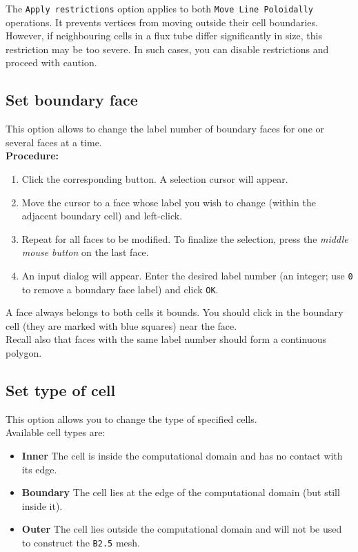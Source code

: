 \documentclass[a4paper,12pt]{article}
\begin{document}
  \begin{infobox}
    The {\tt Apply restrictions} option applies to both {\tt Move Line Poloidally} operations. It prevents vertices from moving outside their cell boundaries. However, if neighbouring cells in a flux tube differ significantly in size, this restriction may be too severe. In such cases, you can disable restrictions and proceed with caution.
  \end{infobox}

  \subsection{Set boundary face}

  This option allows to change the label number of boundary faces for one or several faces at a time. \\

  \textbf{Procedure:}
  \begin{enumerate}[itemsep=2pt,topsep=5pt]
    \item Click the corresponding button. A selection cursor will appear.
    \item Move the cursor to a face whose label you wish to change (within the adjacent boundary cell) and left-click.
    \item Repeat for all faces to be modified. To finalize the selection, press the {\em middle mouse button} on the last face.
    \item An input dialog will appear. Enter the desired label number (an integer; use {\tt 0} to remove a boundary face label) and click {\tt OK}.
  \end{enumerate}

  \begin{importantbox}
    A face always belongs to both cells it bounds. You should click in the boundary cell (they are marked with blue squares) near the face. \\
    Recall also that faces with the same label number should form a continuous polygon.
  \end{importantbox}

  \subsection{Set type of cell}

  This option allows you to change the type of specified cells. \\

  Available cell types are:
  \begin{itemize}[itemsep=2pt,topsep=5pt]
    \item {\bf Inner} The cell is inside the computational domain and has no contact with its edge.
    \item {\bf Boundary} The cell lies at the edge of the computational domain (but still inside it).
    \item {\bf Outer} The cell lies outside the computational domain and will not be used to construct the {\tt B2.5} mesh.
  \end{itemize}
\end{document}

